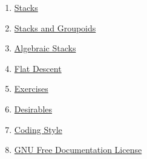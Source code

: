 \begin{multicols}{2}
\begin{enumerate}
\item \hyperref[stacks-section-introduction]{Stacks}
\item \hyperref[stacks-groupoids-section-introduction]{Stacks and Groupoids}
\item \hyperref[algebraic-section-introduction]{Algebraic Stacks}
\item \hyperref[flat-section-introduction]{Flat Descent}
\item \hyperref[exercises-section-algebra]{Exercises}
\item \hyperref[desirables-section-introduction]{Desirables}
\item \hyperref[coding-section-style]{Coding Style}
\item \hyperref[fdl-version]{GNU Free Documentation License}
\end{enumerate}
\end{multicols}
